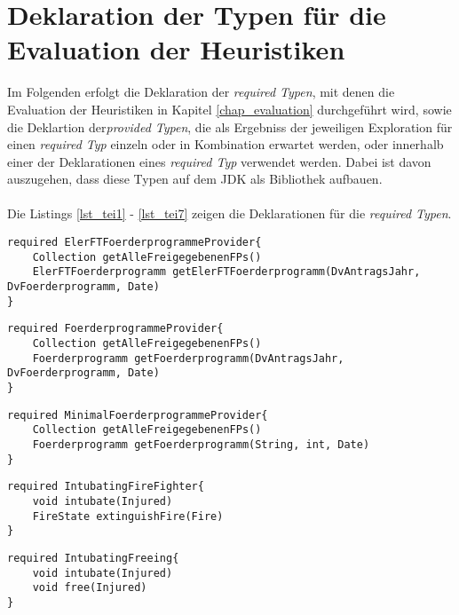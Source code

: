 \chapter{Deklaration der Typen für die Evaluation der Heuristiken}\label{app_evalTypes}
Im Folgenden erfolgt die Deklaration der \emph{required Typen}, mit denen die Evaluation der Heuristiken in Kapitel \ref{chap_evaluation} durchgeführt wird, sowie die Deklartion der\emph{provided Typen}, die als Ergebniss der jeweiligen Exploration für einen \emph{required Typ} einzeln oder in Kombination erwartet werden, oder innerhalb einer der Deklarationen eines \emph{required Typ} verwendet werden. Dabei ist davon auszugehen, dass diese Typen auf dem JDK als Bibliothek aufbauen.
\\\\
Die Listings \ref{lst_tei1} - \ref{lst_tei7} zeigen die Deklarationen für die \emph{required Typen}.
\begin{lstlisting}[style = dsl, caption = Deklartion von ElerFTFoerderprogrammeProvider, captionpos = b, label = lst_tei1]
required ElerFTFoerderprogrammeProvider{
	Collection getAlleFreigegebenenFPs()
	ElerFTFoerderprogramm getElerFTFoerderprogramm(DvAntragsJahr, DvFoerderprogramm, Date)
}
\end{lstlisting}
\begin{lstlisting}[style = dsl, caption = Deklartion von FoerderprogrammeProvider, captionpos = b, label = lst_tei2]
required FoerderprogrammeProvider{
	Collection getAlleFreigegebenenFPs()
	Foerderprogramm getFoerderprogramm(DvAntragsJahr, DvFoerderprogramm, Date)
}
\end{lstlisting}
\begin{lstlisting}[style = dsl, caption = Deklartion von MinimalFoerderprogrammeProvider, captionpos = b, label = lst_tei3]
required MinimalFoerderprogrammeProvider{
	Collection getAlleFreigegebenenFPs()
	Foerderprogramm getFoerderprogramm(String, int, Date)
}
\end{lstlisting}
\begin{lstlisting}[style = dsl, caption = Deklartion von IntubatingFireFighter, captionpos = b, label = lst_tei4]
required IntubatingFireFighter{
	void intubate(Injured)
	FireState extinguishFire(Fire)
}
\end{lstlisting}
\begin{lstlisting}[style = dsl, caption = Deklartion von IntubatingFreeing, captionpos = b, label = lst_tei5]
required IntubatingFreeing{
	void intubate(Injured)
	void free(Injured)
}
\end{lstlisting}
